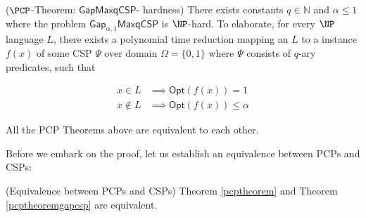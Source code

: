 \begin{theorem} \label{pcptheoremgapcsp}  ($\PCP$-Theorem: $\mathsf{GapMaxqCSP}$- hardness) There exists constants $q \in \mathbb{N}$ and $\alpha \leq 1$ where the problem $\mathsf{Gap}_{\alpha,1}\mathsf{MaxqCSP}$ is $\NP$-hard. To elaborate, for every $\NP$ language $L$, there exists a polynomial time reduction mapping an $L$ to a instance $f(x)$ of some CSP $\Psi$ over domain $\Omega=\{0,1\}$ where $\Psi$ consists of $q$-ary predicates, such that

\begin{align*}
  x \in L & \implies \mathsf{Opt}(f(x)) = 1 \\
  x \not\in L & \implies \mathsf{Opt}(f(x)) \leq \alpha
\end{align*}
\end{theorem}

\begin{theorem}
  All the PCP Theorems above are equivalent to each other.
\end{theorem}

Before we embark on the proof, let us establish an equivalence between PCPs and CSPs:

\begin{lemma} (Equivalence between PCPs and CSPs)
  Theorem \ref{pcptheorem} and  Theorem \ref{pcptheoremgapcsp} are equivalent.
\end{lemma}

